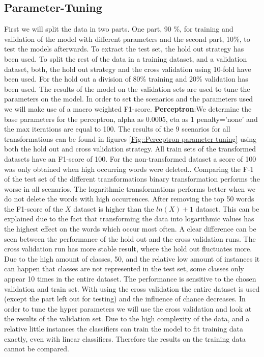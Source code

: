 \documentclass[11pt]{article}
\begin{document}
\subsection{Parameter-Tuning}
First we will split the data in two parts. One part, 90 \%, for training and validation of the model with different parameters and the second part, 10\%, to test the models afterwards. To extract the test set, the hold out strategy has been used.
\newline
To split the rest of the data in a training dataset, and a validation dataset, both, the hold out strategy and the cross validation using 10-fold have been used. For the hold out a division of 80\% training and 20\% validation has been used. 
The results of the model on the validation sets are used to tune the parameters on the model.
\newline
In order to set the scenarios and the parameters used we will make use of a macro weighted F1-score. 
%
\newline
\textbf{Perceptron}:We determine the base parameters for the perceptron, alpha as 0.0005, eta as 1 penalty='none' and the max iterations are equal to 100. The results of the 9 scenarios for all transformations can be found in figures  \ref{Fig::Perceptron parameter tuning} using both the hold out and cross validation strategy.
All train sets of the transformed datasets have an F1-score of 100. For the non-transformed dataset a score of 100 was only obtained when high occurring words were deleted.. 
\newline
Comparing the F-1 of the test set of the different transformations binary transformation performs the worse in all scenarios. The logarithmic transformations performs better when we do not delete the words with high occurrences. After removing the top 50 words the F1-score of the $X$ dataset is higher than the $ln(X)+1$ dataset. This can be explained due to the fact that transforming the data into logarithmic values has the highest effect on the words which occur most often.
\newline
A clear difference can be seen between the performance of the hold out and the cross validation runs. The cross validation run has more stable result, where the hold out fluctuates more. Due to the high amount of classes, 50, and the relative low amount of instances it can happen that classes are not represented in the test set, some classes only appear 10 times in the entire dataset. The performance is sensitive to the chosen validation and train set. With using the cross validation the entire dataset is used (except the part left out for testing) and the influence of chance decreases. In order to tune the hyper parameters we will use the cross validation and look at the results of the validation set. Due to the high complexity of the data, and a relative little instances the classifiers can train the model to fit training data exactly, even with linear classifiers. Therefore the results on the training data cannot be compared. 
\end{document}
